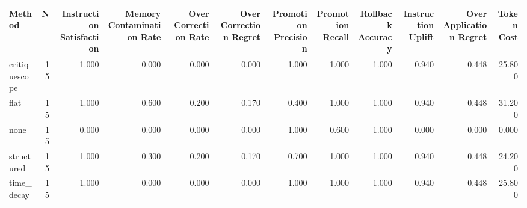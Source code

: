\begin{tabular}{lrrrrrrrrrrr}
\toprule
Method & N & Instruction Satisfaction & Memory Contamination Rate & Over Correction Rate & Over Correction Regret & Promotion Precision & Promotion Recall & Rollback Accuracy & Instruction Uplift & Over Application Regret & Token Cost \\
\midrule
critiquescope & 15 & 1.000 & 0.000 & 0.000 & 0.000 & 1.000 & 1.000 & 1.000 & 0.940 & 0.448 & 25.800 \\
flat & 15 & 1.000 & 0.600 & 0.200 & 0.170 & 0.400 & 1.000 & 1.000 & 0.940 & 0.448 & 31.200 \\
none & 15 & 0.000 & 0.000 & 0.000 & 0.000 & 1.000 & 0.600 & 1.000 & 0.000 & 0.000 & 0.000 \\
structured & 15 & 1.000 & 0.300 & 0.200 & 0.170 & 0.700 & 1.000 & 1.000 & 0.940 & 0.448 & 24.200 \\
time_decay & 15 & 1.000 & 0.000 & 0.000 & 0.000 & 1.000 & 1.000 & 1.000 & 0.940 & 0.448 & 25.800 \\
\bottomrule
\end{tabular}
